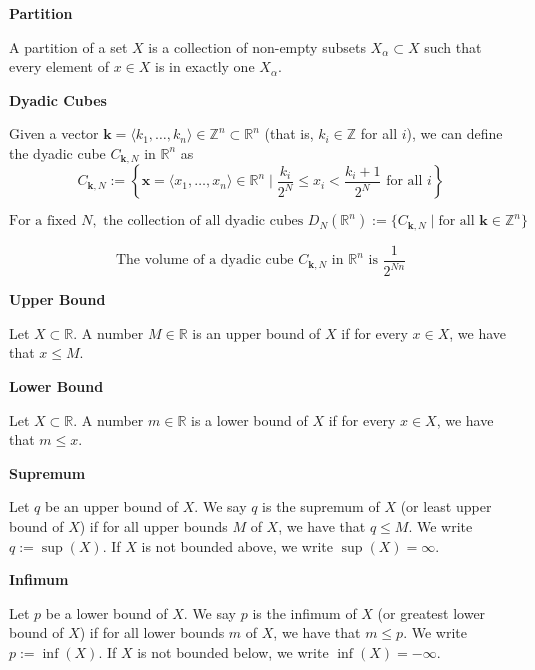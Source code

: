 \documentclass{article}
\newcommand{\R}{\mathbb{R}}
\newenvironment{definition}[1]{
    \par\noindent\textbf{#1}\par\noindent
}{
    \par \vspace{0.5cm}
}
\begin{document}
\begin{definition}{Partition}
    A partition of a set \( X \) is a collection of non-empty subsets \( X_\alpha \subset X \) such that every element of \( x \in X \) is in exactly one \( X_\alpha \).
\end{definition}


\begin{definition}{Dyadic Cubes}
    Given a vector \( \bm{k} = \langle k_1, \ldots, k_n \rangle \in \mathbb{Z}^n \subset \R^n \) (that is, \( k_i \in \mathbb{Z} \) for all \( i \)), we can define the dyadic cube \( C_{\bm{k}, N} \) in \( \R^n \) as
    \[ C_{\bm{k}, N} := \left\{\bm{x} = \langle x_1, \ldots, x_n \rangle \in \R^n \mid \frac{k_i}{2^N} \leq x_i < \frac{k_i + 1}{2^N} \text{ for all } i \right\} \]

    \[
    \text{For a fixed } N, \text{ the collection of all dyadic cubes } D_N(\R^n) := \{C_{\bm{k}, N} \mid \text{for all } \bm{k} \in \mathbb{Z}^n\}
    \]

    \[
    \text{The volume of a dyadic cube } C_{\bm{k}, N} \text{ in } \R^n \text{ is } \frac{1}{2^{Nn}}
    \]


\end{definition}


\begin{definition}{Upper Bound}
    Let \( X \subset \R \). A number \( M \in \R \) is an upper bound of \( X \) if for every \( x \in X \), we have that \( x \leq M \).
\end{definition}


\begin{definition}{Lower Bound}
    Let \( X \subset \R \). A number \( m \in \R \) is a lower bound of \( X \) if for every \( x \in X \),
    we have that \( m \leq x \).
\end{definition}


\begin{definition}{Supremum}
    Let \( q \) be an upper bound of \( X \). We say \( q \) is the supremum of \( X \) (or least upper bound of \( X \)) if for all upper bounds \( M \) of \( X \), we have that \( q \leq M \).
    We write \( q := \sup(X) \). If \( X \) is not bounded above, we write \( \sup(X) = \infty \).
\end{definition}

\begin{definition}{Infimum}
    Let \( p \) be a lower bound of \( X \). We say \( p \) is the infimum of \( X \) (or greatest lower bound of \( X \)) if for all lower bounds \( m \) of \( X \), we have that \( m \leq p \).
    We write \( p := \inf(X) \). If \( X \) is not bounded below, we write \( \inf(X) = -\infty \).
\end{definition}
\end{document}

